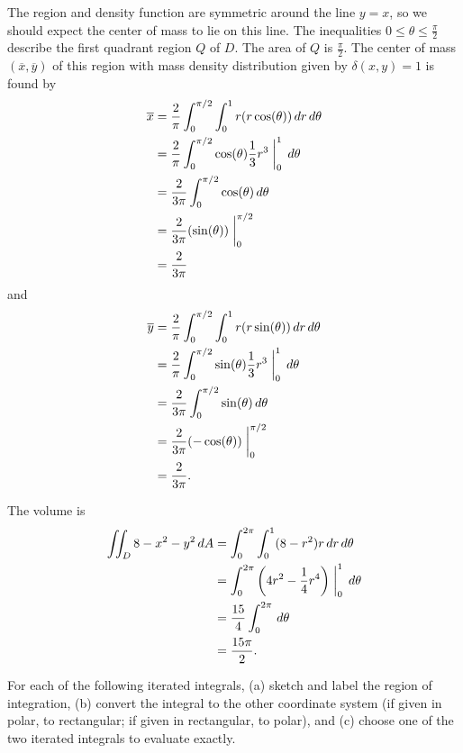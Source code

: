 \begin{exercises}
\begin{exerciseSolution}
	\item The region and density function are symmetric around the line $y=x$, so we should expect the center of mass to lie on this line. The inequalities $0 \leq \theta \leq \frac{\pi}{2}$ describe the first quadrant region $Q$ of $D$. The area of $Q$ is $\frac{\pi}{2}$. The center of mass $(\overline{x}, \overline{y})$ of this region with mass density distribution given by $\delta(x,y) = 1$ is found by 
\begin{align*}
\overline{x} &= \frac{2}{\pi} \int_{0}^{\pi/2} \int_{0}^{1} r(r \cos(\theta)) \, dr \, d\theta \\
		&= \frac{2}{\pi} \int_{0}^{\pi/2} \cos(\theta) \frac{1}{3}r^3\biggm|_{0}^{1} \, d\theta \\
		&= \frac{2}{3 \pi} \int_{0}^{\pi/2} \cos(\theta) \, d\theta \\
		&= \frac{2}{3 \pi} (\sin(\theta))\biggm|_{0}^{\pi/2} \\
		&= \frac{2}{3\pi}
	\end{align*}
and
	\begin{align*}
\overline{y} &=  \frac{2}{\pi} \int_{0}^{\pi/2} \int_{0}^{1} r (r\sin(\theta)) \, dr \, d\theta \\
		&= \frac{2}{\pi} \int_{0}^{\pi/2} \sin(\theta) \frac{1}{3}r^3\biggm|_{0}^{1} \, d\theta \\
		&= \frac{2}{3 \pi} \int_{0}^{\pi/2} \sin(\theta) \, d\theta \\
		&= \frac{2}{3 \pi} (-\cos(\theta))\biggm|_{0}^{\pi/2} \\
		&= \frac{2}{3\pi}.
	\end{align*}

	\item The volume is 
\begin{align*}
\iint_D 8-x^2-y^2 \, dA &= \int_{0}^{2\pi} \int_0^1 (8-r^2) r \, dr \, d \theta \\
	&= \int_{0}^{2\pi} \left( 4r^2 -\frac{1}{4}r^4 \right)\biggm|_0^1 \, d \theta \\
	&= \frac{15}{4} \int_{0}^{2\pi} \, d \theta \\
	&= \frac{15 \pi}{2}. 
\end{align*}

\ea
\end{exerciseSolution}


\item For each of the following iterated integrals, (a) sketch and label the region of integration, (b) convert the integral to the other coordinate system (if given in polar, to rectangular; if given in rectangular, to polar), and (c) choose one of the two iterated integrals to evaluate exactly.
	

\end{exercises}
